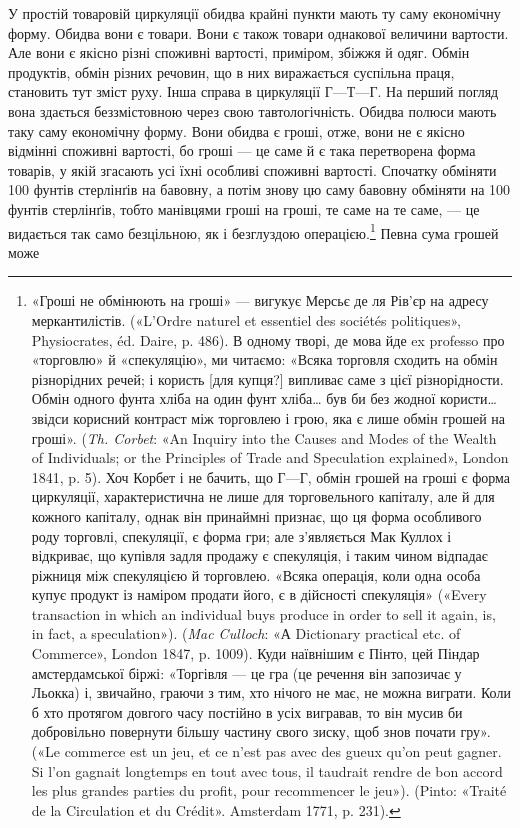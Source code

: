 У простій товаровій циркуляції обидва крайні пункти мають
ту саму економічну форму. Обидва вони є товари. Вони є також
товари однакової величини вартости. Але вони є якісно різні
споживні вартості, приміром, збіжжя й одяг. Обмін продуктів,
обмін різних речовин, що в них виражається суспільна праця,
становить тут зміст руху. Інша справа в циркуляції $Г — Т — Г$.
На перший погляд вона здається беззмістовною через свою тавтологічність.
Обидва полюси мають таку саму економічну форму.
Вони обидва є гроші, отже, вони не є якісно відмінні споживні
вартості, бо гроші — це саме й є така перетворена форма товарів,
у якій згасають усі їхні особливі споживні вартості. Спочатку
обміняти 100 фунтів стерлінґів на бавовну, а потім знову цю саму
бавовну обміняти на 100 фунтів стерлінґів, тобто манівцями
гроші на гроші, те саме на те саме, — це видається так само безцільною,
як і безглуздою операцією.\footnote{
«Гроші не обмінюють на гроші» — вигукує Мерсьє де ля Рів’єр
на адресу меркантилістів. («L’Ordre naturel et essentiel des sociétés politiques»,
Physiocrates, éd. Daire, p. 486). В одному творі, де мова йде
ex professo про «торговлю» й «спекуляцію», ми читаємо: «Всяка торговля
сходить на обмін різнорідних речей; і користь [для купця?] випливає
саме з цієї різнорідности. Обмін одного фунта хліба на один фунт хліба\dots{}
був би без жодної користи\dots{} звідси корисний контраст між торговлею
і грою, яка є лише обмін грошей на гроші». (\emph{Th. Corbet}: «An Inquiry
into the Causes and Modes of the Wealth of Individuals; or the Principles
of Trade and Speculation explained», London 1841, p. 5). Хоч Корбет і не
бачить, що $Г — Г$, обмін грошей на гроші є форма циркуляції, характеристична
не лише для торговельного капіталу, але й для кожного капіталу,
однак він принаймні признає, що ця форма особливого роду торговлі,
спекуляції, є форма гри; але з’являється Мак Куллох і відкриває, що
\parbreak{}
купівля задля продажу є спекуляція, і таким чином відпадає ріжниця
між спекуляцією й торговлею. «Всяка операція, коли одна особа купує
продукт із наміром продати його, є в дійсності спекуляція» («Every
transaction in which an individual buys produce in order to sell it again,
is, in fact, a speculation»). (\emph{Mac Culloch}: «А Dictionary practical etc.
of Commerce», London 1847, p. 1009). Куди наївнішим є Пінто, цей Піндар
амстердамської біржі: «Торгівля — це гра (це речення він запозичає
у Льокка) і, звичайно, граючи з тим, хто нічого не має, не можна
виграти. Коли б хто протягом довгого часу постійно в усіх вигравав,
то він мусив би добровільно повернути більшу частину свого зиску,
щоб знов почати гру». («Le commerce est un jeu, et ce n’est pas avec des
gueux qu’on peut gagner. Si l’on gagnait longtemps en tout avec tous, il
taudrait rendre de bon accord les plus grandes parties du profit, pour
recommencer le jeu»). (Pinto: «Traité de la Circulation et du Crédit».
Amsterdam 1771, p. 231).
} Певна сума грошей може
